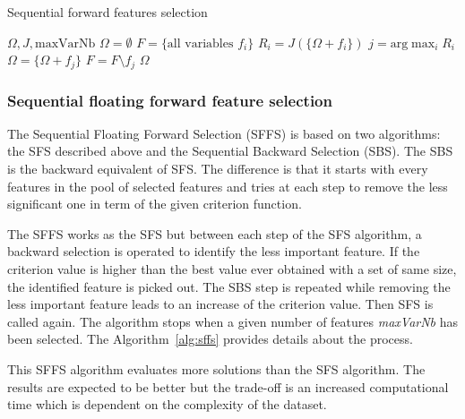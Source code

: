 \documentclass[journal,10pt]{IEEEtran}
\begin{document}
        \begin{algorithm}
        \caption{Sequential forward features selection\label{alg:sfs}}
        {\footnotesize
        \begin{algorithmic}[1]
        \REQUIRE $\Omega,J,\text{maxVarNb}$
        \STATE $\Omega=\emptyset$
        \STATE $F=\text{\{all variables $f_i$\}}$
        \STATE $R_i = J(\{\Omega + f_i\})$
        \ENDFOR
        \STATE $j=\text{arg} \max_{i} R_i$
        \STATE $\Omega = \{\Omega + f_j\}$
        \STATE $F = F \setminus f_j$
        \ENDWHILE
        \RETURN $\Omega$
        \end{algorithmic}
        }
        \end{algorithm}

        \subsubsection{Sequential floating forward feature selection}
        \label{sec:floating-presentation}

        The Sequential Floating Forward Selection (SFFS)\cite{somol1999adaptive} is based on two algorithms: the SFS described above and the Sequential Backward Selection (SBS). The SBS is the backward equivalent of SFS. The difference is that it starts with every features in the pool of selected features and tries at each step to remove the less significant one in term of the given criterion function.

        The SFFS works as the SFS but between each step of the SFS algorithm, a backward selection is operated to identify the less important feature. If the criterion value is higher than the best value ever obtained with a set of same size, the identified feature is picked out. The SBS step is repeated while removing the less important feature leads to an increase of the criterion value. Then SFS is called again. The algorithm stops when a given number of features \emph{maxVarNb} has been selected. The Algorithm~\ref{alg:sffs} provides details about the process.

        This SFFS algorithm evaluates more solutions than the SFS algorithm. The results are expected to be better but the trade-off is an increased computational time which is dependent on the complexity of the dataset.
\end{document}
